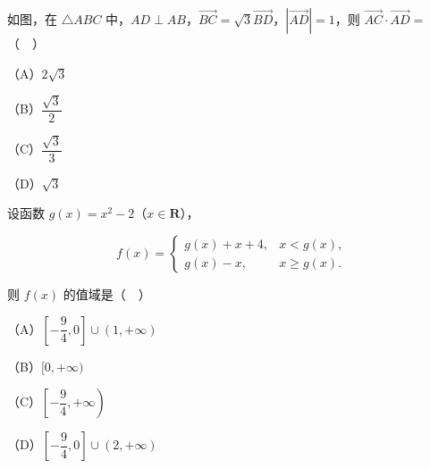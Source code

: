 \endgroup
\begin{question}
如图，在 $\triangle ABC$ 中，$AD\perp AB$，$\overrightarrow{BC}=\sqrt3\overrightarrow{BD}$，$|\overrightarrow{AD}|=1$，则 $\overrightarrow{AC}\cdot\overrightarrow{AD}=$（　）
\nopagebreak[4]
\begin{center}\end{center}
\nopagebreak[4]
（A）$2\sqrt3$

（B）$\dfrac{\sqrt3}2$

（C）$\dfrac{\sqrt3}3$

（D）$\sqrt3$

\end{question}
\begin{question}
设函数 $g(x)=x^2-2$（$x\in\mathbf R$），

\nopagebreak[4]
\[f(x)=\begin{cases}g(x)+x+4,&x<g(x),\\ g(x)-x,&x\geqslant g(x).\end{cases}\]

则 $f(x)$ 的值域是（　）

（A）$\left[-\dfrac94,0\right]\cup(1,+\infty)$

（B）$[0,+\infty)$

（C）$\left[-\dfrac94,+\infty\right)$

（D）$\left[-\dfrac94,0\right]\cup(2,+\infty)$

\end{question}

